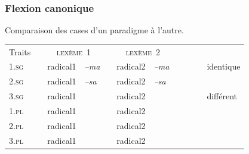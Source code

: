\begin{frame}
\frametitle{Flexion canonique}
Comparaison des cases d'un paradigme à l'autre.

\scriptsize

\begin{table}
\begin{tabular}{|l| p{1mm}|ll|p{1mm}|ll|p{1mm}cl}
\cline{1-1}\cline{3-4}\cline{6-7}
Traits&&\multicolumn{2}{|c|}{\cellcolor{white}\textsc{ lexème~1}}&&\multicolumn{2}{|c|}{\cellcolor{white}\textsc{ lexème~2}}&&\\
\cline{1-1}\cline{3-4}\cline{6-7}
\textsc{1.sg}&& \cellcolor{mandarine}radical1& {\em --ma}&&\cellcolor{mandarine}radical2& {\em
  --ma}&&\cellcolor{ciel}~~~&identique\\
\cline{1-1}\cline{3-4}\cline{6-7}
\textsc{2.sg}& &radical1&{\em --sa}&&radical2& {\em --sa}&&&\\
\cline{1-1}\cline{3-4}\cline{6-7}

\textsc{3.sg}&& radical1&\cellcolor{ciel}{\em --ta}&&radical2& \cellcolor{ciel}{\em
  --ta}&&\cellcolor{mandarine}&différent\\
\cline{1-1}\cline{3-4}\cline{6-7}
\textsc{1.pl}&&radical1&\cellcolor{ciel}{\em --mo}&&radical2&\cellcolor{ciel}{\em --mo}&&\\
\cline{1-1}\cline{3-4}\cline{6-7}
\textsc{2.pl}&&radical1& \cellcolor{ciel}{\em --so}&&radical2&\cellcolor{ciel}{\em --so}&&\\
\cline{1-1}\cline{3-4}\cline{6-7}
\textsc{3.pl}&&radical1&\cellcolor{ciel}{\em --to}&&radical2&\cellcolor{ciel}{\em --to}&&\\
\cline{1-1}\cline{3-4}\cline{6-7}
\end{tabular}\\[1mm]
\end{table}
\end{frame}


